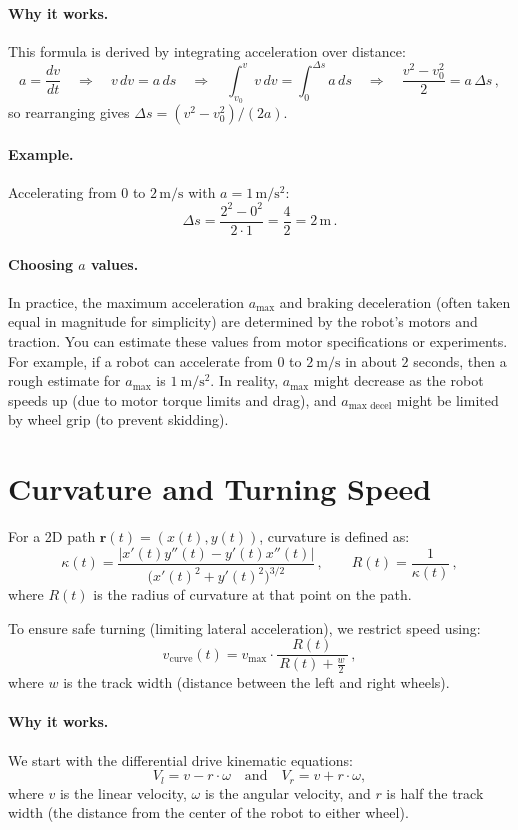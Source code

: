 \documentclass[11pt]{article}
\begin{document}
\paragraph{Why it works.} This formula is derived by integrating acceleration over distance:
\[
a = \frac{dv}{dt}
\quad\Rightarrow\quad
v\,dv = a\,ds
\quad\Rightarrow\quad
\int_{v_0}^{v} v\,dv = \int_{0}^{\Delta s} a\,ds
\quad\Rightarrow\quad
\frac{v^2 - v_0^2}{2} = a\,\Delta s\,,
\] 
so rearranging gives $\Delta s = (v^2 - v_0^2)/(2a)$.

\paragraph{Example.} Accelerating from \(0\) to \(2\,\mathrm{m/s}\) with \(a = 1\,\mathrm{m/s^2}\):
\[
\Delta s = \frac{2^2 - 0^2}{2 \cdot 1} = \frac{4}{2} = 2\,\mathrm{m}\,.
\]

\paragraph{Choosing $a$ values.} In practice, the maximum acceleration $a_{\max}$ and braking deceleration (often taken equal in magnitude for simplicity) are determined by the robot's motors and traction. You can estimate these values from motor specifications or experiments. For example, if a robot can accelerate from 0 to $2~\mathrm{m/s}$ in about $2$ seconds, then a rough estimate for $a_{\max}$ is $1~\mathrm{m/s^2}$. In reality, $a_{\max}$ might decrease as the robot speeds up (due to motor torque limits and drag), and $a_{\text{max decel}}$ might be limited by wheel grip (to prevent skidding).

\section{Curvature and Turning Speed}

For a 2D path \(\mathbf{r}(t) = (x(t), y(t))\), curvature is defined as:
\[
\kappa(t)
= \frac{|x'(t)y''(t) - y'(t)x''(t)|}
       {\big(x'(t)^2 + y'(t)^2\big)^{3/2}}\,,
\qquad
R(t) = \frac{1}{\kappa(t)}\,,
\] 
where \(R(t)\) is the radius of curvature at that point on the path.

To ensure safe turning (limiting lateral acceleration), we restrict speed using:
\[
v_{\text{curve}}(t)
= v_{\max} \cdot \frac{R(t)}{\,R(t) + \tfrac{w}{2}\,}\,,
\] 
where \(w\) is the track width (distance between the left and right wheels). 

\paragraph{Why it works.}
We start with the differential drive kinematic equations:
\[
V_l = v - r \cdot \omega \quad \text{and} \quad V_r = v + r \cdot \omega,
\]
where \(v\) is the linear velocity, \(\omega\) is the angular velocity, and \(r\) is half the track width (the distance from the center of the robot to either wheel).
\end{document}
